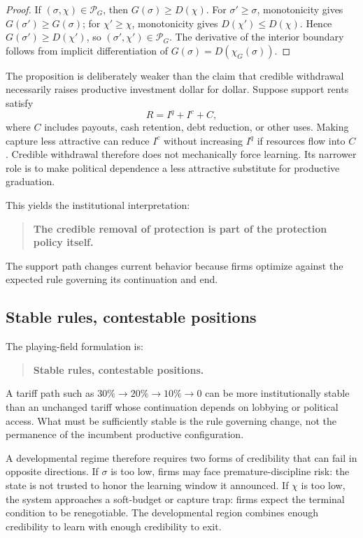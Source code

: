 \begin{proof}
If $(\sigma,\chi)\in\mathcal P_G$, then $G(\sigma)\ge D(\chi)$. For $\sigma'\ge\sigma$, monotonicity gives $G(\sigma')\ge G(\sigma)$; for $\chi'\ge\chi$, monotonicity gives $D(\chi')\le D(\chi)$. Hence $G(\sigma')\ge D(\chi')$, so $(\sigma',\chi')\in\mathcal P_G$. The derivative of the interior boundary follows from implicit differentiation of $G(\sigma)=D(\chi_G(\sigma))$.
\end{proof}

The proposition is deliberately weaker than the claim that credible withdrawal necessarily raises productive investment dollar for dollar. Suppose support rents satisfy
\begin{equation}
R=I^q+I^c+C,
\end{equation}
where $C$ includes payouts, cash retention, debt reduction, or other uses. Making capture less attractive can reduce $I^c$ without increasing $I^q$ if resources flow into $C$. Credible withdrawal therefore does not mechanically force learning. Its narrower role is to make political dependence a less attractive substitute for productive graduation.

This yields the institutional interpretation:
\begin{quote}
\textbf{The credible removal of protection is part of the protection policy itself.}
\end{quote}
The support path changes current behavior because firms optimize against the expected rule governing its continuation and end.

\subsection{Stable rules, contestable positions}

The playing-field formulation is:
\begin{quote}
\textbf{Stable rules, contestable positions.}
\end{quote}
A tariff path such as $30\%\rightarrow20\%\rightarrow10\%\rightarrow0$ can be more institutionally stable than an unchanged tariff whose continuation depends on lobbying or political access. What must be sufficiently stable is the rule governing change, not the permanence of the incumbent productive configuration.

A developmental regime therefore requires two forms of credibility that can fail in opposite directions. If $\sigma$ is too low, firms may face premature-discipline risk: the state is not trusted to honor the learning window it announced. If $\chi$ is too low, the system approaches a soft-budget or capture trap: firms expect the terminal condition to be renegotiable. The developmental region combines enough credibility to learn with enough credibility to exit.

